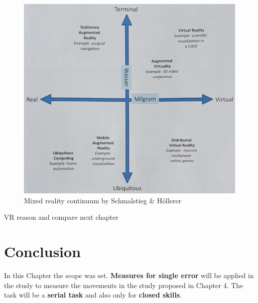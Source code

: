 \begin{figure}
	\centering
	\includegraphics[width=1.0\textwidth]{img/mr_cont_sh.jpg}
	\caption{Mixed reality continuum by Schmalstieg \& Höllerer \cite{Schmalstieg}}
	\label{fig:sh_cont}
\end{figure}
\todo VR reason and compare next chapter



\section{Conclusion}
In this Chapter the scope was set. \textbf{Measures for single error} will be applied in the study to measure the movements in the study proposed in Chapter 4. The task will be a \textbf{serial task} and also only for \textbf{closed skills}.